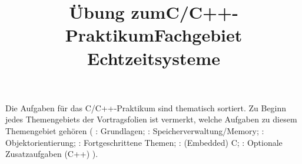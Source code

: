 

\title{Übung zum\linebreak[1]C/C++-Praktikum\linebreak[1] Fachgebiet Echtzeitsysteme}

\setcounter{section}{0}



\maketitle

\noindent Die Aufgaben für das C/C++-Praktikum sind thematisch sortiert.
Zu Beginn jedes Themengebiets der Vortragsfolien ist vermerkt, welche Aufgaben zu diesem Themengebiet gehören (%
\ExercisePrefixBasics{}: Grundlagen; 
\ExercisePrefixMemory{}: Speicherverwaltung/Memory;
\ExercisePrefixObjectOrientation{}: Objektorientierung;
\ExercisePrefixAdvanced{}: Fortgeschrittene Themen;
\ExercisePrefixEmbeddedC{}: (Embedded) C;
\ExercisePrefixElevator{}: Optionale Zusatzaufgaben (C++)
).
%
\setcounter{tocdepth}{1}
\setlength\cftsecnumwidth{10em}
\setlength\cftbeforesecskip{.1em} %
\tableofcontents

\vspace*{\fill}
\cclicense

\newpage







\newpage

\newpage

\newpage


\newpage
{}



\newpage

\newpage

\newpage

\newpage


